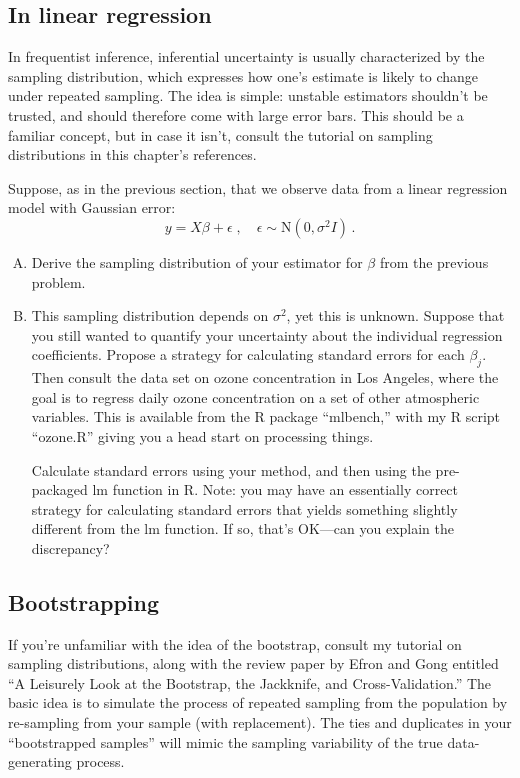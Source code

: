 \documentclass{mynotes}
\newcommand{\N}{\mbox{N}}
\begin{document}
\subsection{In linear regression}

In frequentist inference, inferential uncertainty is usually characterized by the sampling distribution, which expresses how one's estimate is likely to change under repeated sampling.  The idea is simple: unstable estimators shouldn't be trusted, and should therefore come with large error bars.  This should be a familiar concept, but in case it isn't, consult the tutorial on sampling distributions in this chapter's references.

Suppose, as in the previous section, that we observe data from a linear regression model with Gaussian error:
$$
y = X \beta + \epsilon \; , \quad \epsilon \sim \N(0, \sigma^2 I) \, .
$$

\begin{enumerate}[(A)]

\item Derive the sampling distribution of your estimator for $\beta$ from the previous problem.

\item This sampling distribution depends on $\sigma^2$, yet this is unknown.  Suppose that you still wanted to quantify your uncertainty about the individual regression coefficients.  Propose a strategy for calculating standard errors for each $\beta_j$.  Then consult the data set on ozone concentration in Los Angeles, where the goal is to regress daily ozone concentration on a set of other atmospheric variables.  This is available from the R package ``mlbench,'' with my R script ``ozone.R'' giving you a head start on processing things.

Calculate standard errors using your method, and then using the pre-packaged lm function in R.  Note: you may have an essentially correct strategy for calculating standard errors that yields something slightly different from the lm function.  If so, that's OK---can you explain the discrepancy?

\end{enumerate}

\subsection{Bootstrapping}

If you're unfamiliar with the idea of the bootstrap, consult my tutorial on sampling distributions, along with the review paper by Efron and Gong entitled ``A Leisurely Look at the Bootstrap, the Jackknife, and Cross-Validation.''  The basic idea is to simulate the process of repeated sampling from the population by re-sampling from your sample (with replacement).  The ties and duplicates in your ``bootstrapped samples'' will mimic the sampling variability of the true data-generating process.
\end{document}
